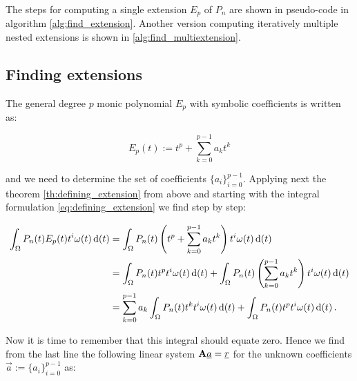 \documentclass[a4paper,10pt]{article}
\begin{document}
The steps for computing a single extension $E_p$ of $P_n$ are shown in pseudo-code
in algorithm \eqref{alg:find_extension}. Another version computing iteratively
multiple nested extensions is shown in \eqref{alg:find_multiextension}.


\subsection{Finding extensions}

The general degree $p$ monic polynomial $E_p$ with symbolic coefficients is
written as:

\begin{equation}
  E_p(t) := t^p + \sum_{k=0}^{p-1} a_k t^k
\end{equation}

and we need to determine the set of coefficients $\{a_i\}_{i=0}^{p-1}$.
Applying next the theorem \ref{th:defining_extension} from above and starting
with the integral formulation \eqref{eq:defining_extension} we find step by step:

\begin{equation}
\begin{split}
  \int_\Omega P_n(t) E_p(t) t^i \omega(t) \,\mathrm{d}(t)
  & = \int_\Omega P_n(t) \left(t^p + \sum_{k=0}^{p-1} a_k t^k\right) t^i \omega(t) \,\mathrm{d}(t) \\
  & = \int_\Omega P_n(t) t^p t^i \omega(t) \,\mathrm{d}(t)
    + \int_\Omega P_n(t) \left(\sum_{k=0}^{p-1} a_k t^k\right) t^i \omega(t) \,\mathrm{d}(t) \\
  & = \sum_{k=0}^{p-1} a_k \int_\Omega P_n(t) t^k t^i \omega(t) \,\mathrm{d}(t)
    + \int_\Omega P_n(t) t^p t^i \omega(t) \,\mathrm{d}(t) \,.
\end{split}
\end{equation}

Now it is time to remember that this integral should equate zero. Hence we find
from the last line the following linear system $\mathbf{A} \underline{a} = \underline{r}$
for the unknown coefficients $\vec{a} := \{a_i\}_{i=0}^{p-1}$ as:
\end{document}
